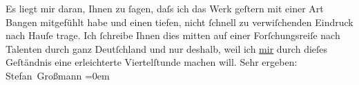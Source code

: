\begin{ledgroupsized}[t]{13cm}
           \pstart
           Es liegt mir daran, Ihnen zu ſagen, daſs ich das Werk geſtern mit einer Art Bangen
               mitgefühlt habe und einen tiefen, nicht ſchnell zu verwiſchenden Eindruck nach Hauſe
               trage.\pend
           \pstart
           Ich ſchreibe Ihnen dies mitten auf einer Forſchungsreiſe nach Talenten durch ganz Deutſchland und nur deshalb, {\pb}weil ich \uline{mir}
               durch dieſes Geſtändnis eine erleichterte Viertelſtunde machen will.\pend
           \pstart
           Sehr ergeben:{\\[\baselineskip]}\spacefill\mbox{Stefan Großmann}\pend
           \leftskip=0em{}          \endnumbering{}\end{ledgroupsized}  \newcommand{\dateiname}{L02052}\newcommand{\titel}{Stefan Großmann an Arthur Schnitzler, 5. 2. 1912}\newcommand{\editorInnen}{ Martin Anton Müller und Gerd-Hermann Susen}
            \footnotesize
\begin{ledgroupsized}[t]{11.5cm}
\end{ledgroupsized}
         
      